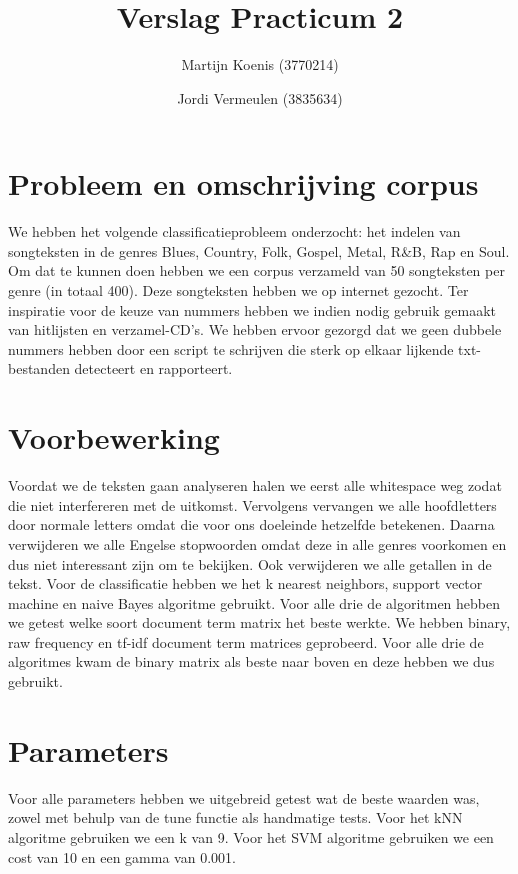 \documentclass[a4paper,oneside]{article}
\begin{document}
\title{Verslag Practicum 2}
\author{Martijn Koenis (3770214) \and Jordi Vermeulen (3835634)}
\date{}
\maketitle
\tabulinesep=1.2mm

\begin{abstract}
\end{abstract}

\section{Probleem en omschrijving corpus}
We hebben het volgende classificatieprobleem onderzocht: het indelen van songteksten in de genres Blues, Country, Folk, Gospel, Metal, R\&B, Rap en Soul.  Om dat te kunnen doen hebben we een corpus verzameld van 50 songteksten per genre (in totaal 400). Deze songteksten hebben we op internet gezocht. Ter inspiratie voor de keuze van nummers hebben we indien nodig gebruik gemaakt van hitlijsten en verzamel-CD's. We hebben ervoor gezorgd dat we geen dubbele nummers hebben door een script te schrijven die sterk op elkaar lijkende txt-bestanden detecteert en rapporteert.

\section{Voorbewerking}
Voordat we de teksten gaan analyseren halen we eerst alle whitespace weg zodat die niet interfereren met de uitkomst. Vervolgens vervangen we alle hoofdletters door normale letters omdat die voor ons doeleinde hetzelfde betekenen. Daarna verwijderen we alle Engelse stopwoorden omdat deze in alle genres voorkomen en dus niet interessant zijn om te bekijken. Ook verwijderen we alle getallen in de tekst. Voor de classificatie hebben we het k nearest neighbors, support vector machine en naive Bayes algoritme gebruikt. Voor alle drie de algoritmen hebben we getest welke soort document term matrix het beste werkte. We hebben binary, raw frequency en tf-idf document term matrices geprobeerd. Voor alle drie de algoritmes kwam de binary matrix als beste naar boven en deze hebben we dus gebruikt.

\section{Parameters}
Voor alle parameters hebben we uitgebreid getest wat de beste waarden was, zowel met behulp van de tune functie als handmatige tests. Voor het kNN algoritme gebruiken we een k van 9. Voor het SVM algoritme gebruiken we een cost van 10 en een gamma van 0.001.
\end{document}
